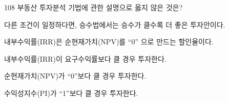 \begin{question}{108}
부동산 투자분석 기법에 관한 설명으로 옳지 않은 것은?
\begin{choices}
  \item 다른 조건이 일정하다면, 승수법에서는 승수가 클수록 더 좋은 투자안이다.
  \item 내부수익률(IRR)은 순현재가치(NPV)를 “0” 으로 만드는 할인율이다.
  \item 내부수익률(IRR)이 요구수익률보다 클 경우 투자한다.
  \item 순현재가치(NPV)가 “0”보다 클 경우 투자한다.
  \item 수익성지수(PI)가 “1”보다 클 경우 투자한다.
\end{choices}
\end{question}
